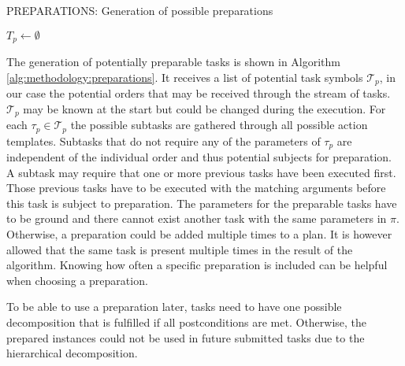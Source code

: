 \begin{algorithm}
    \caption{PREPARATIONS: Generation of possible preparations}
    \label{alg:methodology:preparations}
    $T_p \leftarrow \emptyset$\;
\end{algorithm}

The generation of potentially preparable tasks is shown in Algorithm \ref{alg:methodology:preparations}.
It receives a list of potential task symbols $\mathcal{T}_p$, in our case the potential orders that may be received through the stream of tasks.
$\mathcal{T}_p$ may be known at the start but could be changed during the execution.
For each $\tau_p \in \mathcal{T}_p$ the possible subtasks are gathered through all possible action templates.
Subtasks that do not require any of the parameters of $\tau_p$ are independent of the individual order and thus potential subjects for preparation.
A subtask may require that one or more previous tasks have been executed first.
Those previous tasks have to be executed with the matching arguments before this task is subject to preparation.
The parameters for the preparable tasks have to be ground and there cannot exist another task with the same parameters in $\pi$.
Otherwise, a preparation could be added multiple times to a plan.
It is however allowed that the same task is present multiple times in the result of the algorithm.
Knowing how often a specific preparation is included can be helpful when choosing a preparation.

To be able to use a preparation later, tasks need to have one possible decomposition that is fulfilled if all postconditions are met.
Otherwise, the prepared instances could not be used in future submitted tasks due to the hierarchical decomposition.


